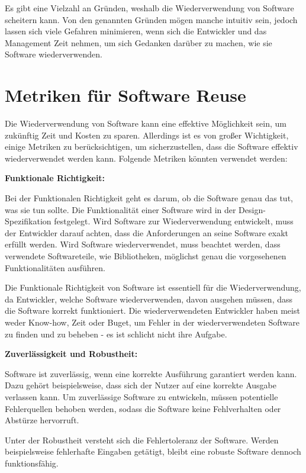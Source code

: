 \documentclass[utf8,biblatex]{lni}
\begin{document}
Es gibt eine Vielzahl an Gründen, weshalb die Wiederverwendung von Software scheitern kann. Von den genannten Gründen mögen manche intuitiv sein, jedoch lassen sich viele Gefahren minimieren, wenn sich die Entwickler und das Management Zeit nehmen, um sich Gedanken darüber zu machen, wie sie Software wiederverwenden.  
\section{Metriken für Software Reuse}


Die Wiederverwendung von Software kann eine effektive Möglichkeit sein, um zukünftig Zeit und Kosten zu sparen. Allerdings ist es von großer Wichtigkeit, einige Metriken zu berücksichtigen, um sicherzustellen, dass die Software effektiv wiederverwendet werden kann. Folgende Metriken könnten verwendet werden:

\textbf{Funktionale Richtigkeit:}
    
    Bei der Funktionalen Richtigkeit geht es darum, ob die Software genau das tut, was sie tun sollte. Die Funktionalität einer Software wird in der Design-Spezifikation festgelegt. Wird Software zur Wiederverwendung entwickelt, muss der Entwickler darauf achten, dass die Anforderungen an seine Software exakt erfüllt werden. Wird Software wiederverwendet, muss beachtet werden, dass verwendete Softwareteile, wie Bibliotheken, möglichst genau die vorgesehenen Funktionalitäten ausführen. 
    
    Die Funktionale Richtigkeit von Software ist essentiell für die Wiederverwendung, da Entwickler, welche Software wiederverwenden, davon ausgehen müssen, dass die Software korrekt funktioniert. Die wiederverwendeten Entwickler haben meist weder Know-how, Zeit oder Buget, um Fehler in der wiederverwendeten Software zu finden und zu beheben - es ist schlicht nicht ihre Aufgabe. 
    
    \textbf{Zuverlässigkeit und Robustheit: }
    
    Software ist zuverlässig, wenn eine korrekte Ausführung garantiert werden kann. Dazu gehört beispielsweise, dass sich der Nutzer auf eine korrekte Ausgabe verlassen kann. Um zuverlässige Software zu entwickeln, müssen potentielle Fehlerquellen behoben werden, sodass die Software keine Fehlverhalten oder Abstürze hervorruft. 
    
    Unter der Robustheit versteht sich die Fehlertoleranz der Software. Werden beispielsweise fehlerhafte Eingaben getätigt, bleibt eine robuste Software dennoch funktionsfähig.
    
\end{document}
